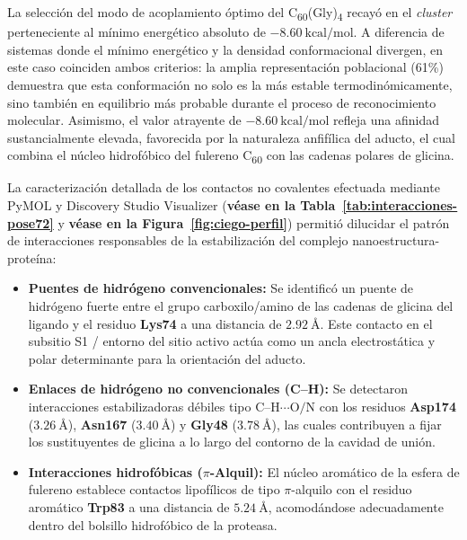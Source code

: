 \begin{table}[htbp]
La selección del modo de acoplamiento óptimo del C\textsubscript{60}(Gly)\textsubscript{4} recayó en el \textit{cluster} perteneciente al mínimo energético absoluto de $-8.60\ \text{kcal/mol}$. A diferencia de sistemas donde el mínimo energético y la densidad conformacional divergen, en este caso coinciden ambos criterios: la amplia representación poblacional (61\%) demuestra que esta conformación no solo es la más estable termodinómicamente, sino también  en equilibrio más probable durante el proceso de reconocimiento molecular. Asimismo, el valor atrayente de $-8.60\ \text{kcal/mol}$ refleja una afinidad sustancialmente elevada, favorecida por la naturaleza anfifílica del aducto, el cual combina el núcleo hidrofóbico del fulereno C\textsubscript{60} con las cadenas polares de glicina.

La caracterización detallada de los contactos no covalentes efectuada mediante PyMOL y Discovery Studio Visualizer (\textbf{véase en la Tabla~\ref{tab:interacciones-pose72}} y \textbf{véase en la Figura~\ref{fig:ciego-perfil}}) permitió dilucidar el patrón de interacciones responsables de la estabilización del complejo nanoestructura-proteína:

\begin{itemize}
    \item \textbf{Puentes de hidrógeno convencionales:} Se identificó un puente de hidrógeno fuerte entre el grupo carboxilo/amino de las cadenas de glicina del ligando y el residuo \textbf{Lys74} a una distancia de $2.92\ \text{\AA}$. Este contacto en el subsitio S1 / entorno del sitio activo actúa como un ancla electrostática y polar determinante para la orientación del aducto.
    \item \textbf{Enlaces de hidrógeno no convencionales (C--H):} Se detectaron interacciones estabilizadoras débiles tipo $\text{C--H}\cdots\text{O/N}$ con los residuos \textbf{Asp174} ($3.26\ \text{\AA}$), \textbf{Asn167} ($3.40\ \text{\AA}$) y \textbf{Gly48} ($3.78\ \text{\AA}$), las cuales contribuyen a fijar los sustituyentes de glicina a lo largo del contorno de la cavidad de unión.
    \item \textbf{Interacciones hidrofóbicas ($\pi$-Alquil):} El núcleo aromático de la esfera de fulereno establece contactos lipofílicos de tipo $\pi$-alquilo con el residuo aromático \textbf{Trp83} a una distancia de $5.24\ \text{\AA}$, acomodándose adecuadamente dentro del bolsillo hidrofóbico de la proteasa.
\end{itemize}


\end{table}

